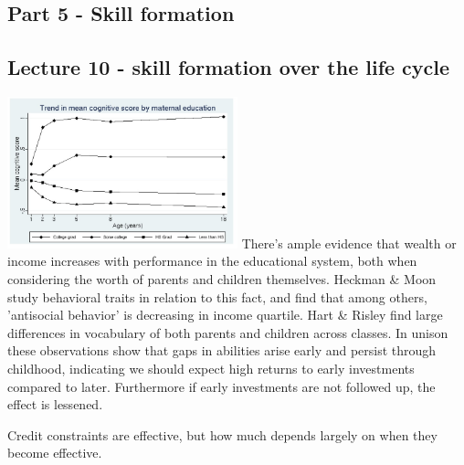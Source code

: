 \documentclass[12pt, a4paper]{article}
\begin{document}
\begin{multicols}{2}
\section{Part 5 - Skill formation}
\subsection{Lecture 10 - skill formation over the life cycle}
\includegraphics[width = 0.5\textwidth]{mateduc.jpg}
There's ample evidence that wealth or income increases with performance in the educational system, both when considering the worth of parents and children themselves. Heckman \& Moon study behavioral traits in relation to this fact, and find that among others, 'antisocial behavior' is decreasing in income quartile. Hart \& Risley find large differences in vocabulary of both parents and children across classes. In unison these observations show that gaps in abilities arise early and persist through childhood, indicating we should expect high returns to early investments compared to later. Furthermore if early investments are not followed up, the effect is lessened.

Credit constraints are effective, but how much depends largely on when they become effective. 


\end{multicols}
\end{document}
